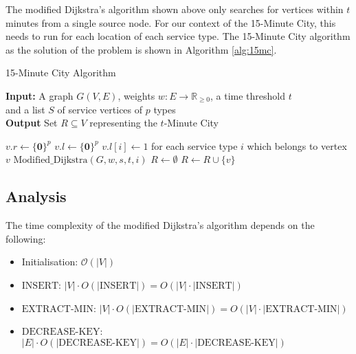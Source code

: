 The modified Dijkstra's algorithm shown above only searches for vertices within $t$ minutes from a single source node. For our context of the 15-Minute City, this needs to run for each location of each service type. The 15-Minute City algorithm as the solution of the problem is shown in Algorithm \ref{alg:15mc}.

\begin{algorithm}[H]
    \caption{15-Minute City Algorithm}\label{alg:15mc}
    \textbf{Input:} A graph $G(V,E)$, weights $w:E\rightarrow\mathbb{R}_{\geq 0}$, a time threshold $t$ \\  and a list $S$ of service vertices of $p$ types\\
    \textbf{Output} Set $R\subseteq V$ representing the $t$-Minute City
    \begin{algorithmic}
            \State $v.r \gets \{\mathbf{0}\}^{p}$
            \State $v.l \gets \{\mathbf{0}\}^{p}$
        \EndFor
            \State $v.l[i] \gets 1$ for each service type $i$ which belongs to vertex $v$
        \EndFor
                \State $\text{Modified\_Dijkstra}(G,w,s,t,i)$
            \EndFor
        \EndFor
        \State $R\gets\emptyset$
                \State $R \gets R\cup \{v\}$
            \EndIf
        \EndFor
    \end{algorithmic}
\end{algorithm}

\subsection{Analysis}

The time complexity of the modified Dijkstra's algorithm depends on the following:

\begin{itemize}
    \item Initialisation: $\mathcal{O}(|V|)$
    \item $\text{INSERT}$: $|V|\cdot O(|\text{INSERT}|)=O(|V|\cdot|\text{INSERT}|)$
    \item $\text{EXTRACT-MIN}$: $|V|\cdot O(|\text{EXTRACT-MIN}|)=O(|V|\cdot|\text{EXTRACT-MIN}|)$
    \item $\text{DECREASE-KEY}$: $|E|\cdot O(|\text{DECREASE-KEY}|)=O(|E|\cdot|\text{DECREASE-KEY}|)$
\end{itemize}

